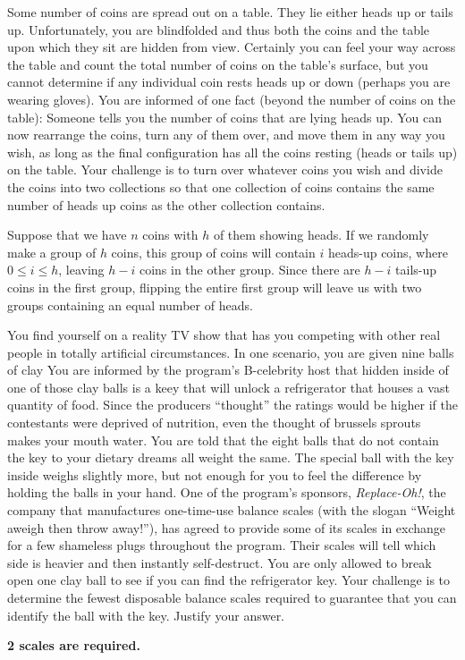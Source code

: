 \documentclass[answers]{exam}
\begin{document}
\begin{questions}
\question %
Some number of coins are spread out on a table. They lie either heads up or tails up. Unfortunately, you are blindfolded and thus both the coins and the table upon which they sit are hidden from view. Certainly you can feel your way across the table and count the total number of coins on the table's surface, but you cannot determine if any individual coin rests heads up or down (perhaps you are wearing gloves). You are informed of one fact (beyond the number of coins on the table): Someone tells you the number of coins that are lying heads up. You can now rearrange the coins, turn any of them over, and move them in any way you wish, as long as the final configuration has all the coins resting (heads or tails up) on the table. Your challenge is to turn over whatever coins you wish and divide the coins into two collections so that one collection of coins contains the same number of heads up coins as the other collection contains.
\begin{solution}
Suppose that we have $n$ coins with $h$ of them showing heads. If we randomly make a group of $h$ coins, this group of coins will contain $i$ heads-up coins, where $0 \leq i \leq h$, leaving $h - i$ coins in the other group. Since there are $h - i$ tails-up coins in the first group, flipping the entire first group will leave us with two groups containing an equal number of heads.
\end{solution}

\question %
You find yourself on a reality TV show that has you competing with other real people in totally artificial circumstances. In one scenario, you are given nine balls of clay You are informed by the program's B-celebrity host that hidden inside of one of those clay balls is a keey that will unlock a refrigerator that houses a vast quantity of food. Since the producers ``thought'' the ratings would be higher if the contestants were deprived of nutrition, even the thought of brussels sprouts makes your mouth water. You are told that the eight balls that do not contain the key to your dietary dreams all weight the same. The special ball with the key inside weighs slightly more, but not enough for you to feel the difference by holding the balls in your hand. One of the program's sponsors, \textit{Replace-Oh!}, the company that manufactures one-time-use balance scales (with the slogan ``Weight aweigh then throw away!''), has agreed to provide some of its scales in exchange for a few shameless plugs throughout the program. Their scales will tell which side is heavier and then instantly self-destruct. You are only allowed to break open one clay ball to see if you can find the refrigerator key. Your challenge is to determine the fewest disposable balance scales required to guarantee that you can identify the ball with the key. Justify your answer.
\begin{solution}
\textbf{2 scales are required.}


\end{solution}
\end{questions}
\end{document}
